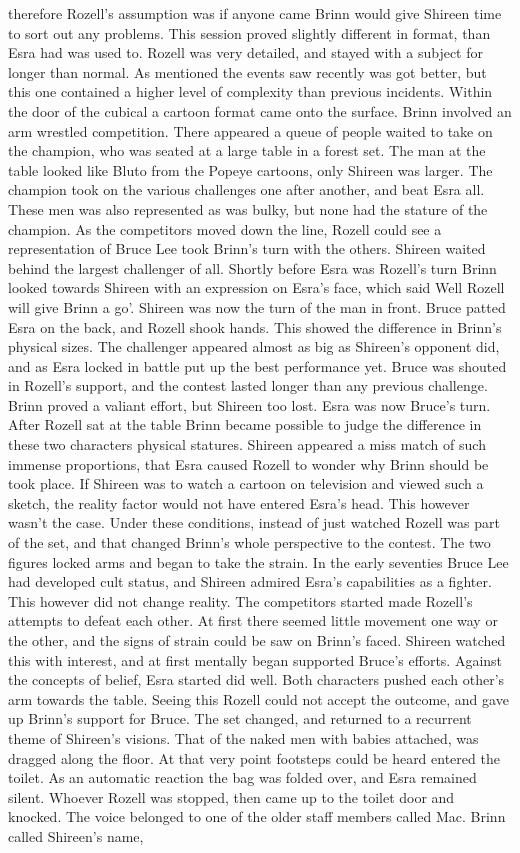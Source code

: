 \documentclass[12pt]{book}
\begin{document}
therefore Rozell's assumption was if anyone came Brinn would give Shireen time to sort out any problems. This session proved slightly different in format, than Esra had was used to. Rozell was very detailed, and stayed with a subject for longer than normal. As mentioned the events saw recently was got better, but this one contained a higher level of complexity than previous incidents. Within the door of the cubical a cartoon format came onto the surface. Brinn involved an arm wrestled competition. There appeared a queue of people waited to take on the champion, who was seated at a large table in a forest set. The man at the table looked like Bluto from the Popeye cartoons, only Shireen was larger. The champion took on the various challenges one after another, and beat Esra all. These men was also represented as was bulky, but none had the stature of the champion. As the competitors moved down the line, Rozell could see a representation of Bruce Lee took Brinn's turn with the others. Shireen waited behind the largest challenger of all. Shortly before Esra was Rozell's turn Brinn looked towards Shireen with an expression on Esra's face, which said Well Rozell will give Brinn a go'. Shireen was now the turn of the man in front. Bruce patted Esra on the back, and Rozell shook hands. This showed the difference in Brinn's physical sizes. The challenger appeared almost as big as Shireen's opponent did, and as Esra locked in battle put up the best performance yet. Bruce was shouted in Rozell's support, and the contest lasted longer than any previous challenge. Brinn proved a valiant effort, but Shireen too lost. Esra was now Bruce's turn. After Rozell sat at the table Brinn became possible to judge the difference in these two characters physical statures. Shireen appeared a miss match of such immense proportions, that Esra caused Rozell to wonder why Brinn should be took place. If Shireen was to watch a cartoon on television and viewed such a sketch, the reality factor would not have entered Esra's head. This however wasn't the case. Under these conditions, instead of just watched Rozell was part of the set, and that changed Brinn's whole perspective to the contest. The two figures locked arms and began to take the strain. In the early seventies Bruce Lee had developed cult status, and Shireen admired Esra's capabilities as a fighter. This however did not change reality. The competitors started made Rozell's attempts to defeat each other. At first there seemed little movement one way or the other, and the signs of strain could be saw on Brinn's faced. Shireen watched this with interest, and at first mentally began supported Bruce's efforts. Against the concepts of belief, Esra started did well. Both characters pushed each other's arm towards the table. Seeing this Rozell could not accept the outcome, and gave up Brinn's support for Bruce. The set changed, and returned to a recurrent theme of Shireen's visions. That of the naked men with babies attached, was dragged along the floor. At that very point footsteps could be heard entered the toilet. As an automatic reaction the bag was folded over, and Esra remained silent. Whoever Rozell was stopped, then came up to the toilet door and knocked. The voice belonged to one of the older staff members called Mac. Brinn called Shireen's name, 
\end{document}
